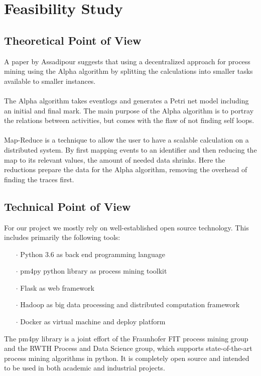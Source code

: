 \documentclass[runningheads]{llncs}
\begin{document}
\section{Feasibility Study}

\subsection{Theoretical Point of View}
A paper by Assadipour\cite{mapReduce} suggests that using a decentralized approach for process mining using the Alpha algorithm by splitting the calculations into smaller tasks available to smaller instances. \\ \ \\
The Alpha algorithm takes eventlogs and generates a Petri net model including an initial and final mark. The main purpose of the Alpha algorithm is to portray the relations between activities, but comes with the flaw of not finding self loops.  \\ \ \\
Map-Reduce is a technique to allow the user to have a scalable calculation on a distributed system. By first mapping events to an identifier and then reducing the map to its relevant values, the amount of needed data shrinks. Here the reductions prepare the data for the Alpha algorithm, removing the overhead of finding the traces first.
\subsection{Technical Point of View}
For our project we mostly rely on well-established open source technology. This includes primarily the following tools:\\

\begin{itemize}
	\item[\Large $\cdot$]   Python 3.6 as back end programming language
	\item[\Large $\cdot$]   pm4py python library as process mining toolkit
	\item[\Large $\cdot$]   Flask as web framework
	\item[\Large $\cdot$]   Hadoop as big data processing and distributed computation framework
	\item[\Large $\cdot$]   Docker as virtual machine and deploy platform\\
\end{itemize}

\noindent
The pm4py library is a joint effort of the Fraunhofer FIT process mining group\cite{FIT} and the RWTH Process and Data Science group\cite{pads}, which supports state-of-the-art process mining algorithms in python. It is completely open source and intended to be used in both academic and industrial projects.\\
\end{document}
